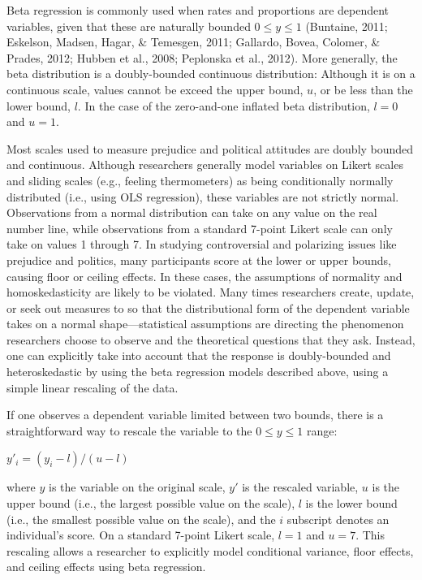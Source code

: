 \documentclass[english,,man]{apa6}
\begin{document}
Beta regression is commonly used when rates and proportions are dependent variables, given that these are naturally bounded \(0 \leq y \leq 1\) (Buntaine, 2011; Eskelson, Madsen, Hagar, \& Temesgen, 2011; Gallardo, Bovea, Colomer, \& Prades, 2012; Hubben et al., 2008; Peplonska et al., 2012). More generally, the beta distribution is a doubly-bounded continuous distribution: Although it is on a continuous scale, values cannot be exceed the upper bound, \(u\), or be less than the lower bound, \(l\). In the case of the zero-and-one inflated beta distribution, \(l = 0\) and \(u = 1\).

Most scales used to measure prejudice and political attitudes are doubly bounded and continuous. Although researchers generally model variables on Likert scales and sliding scales (e.g., feeling thermometers) as being conditionally normally distributed (i.e., using OLS regression), these variables are not strictly normal. Observations from a normal distribution can take on any value on the real number line, while observations from a standard 7-point Likert scale can only take on values 1 through 7. In studying controversial and polarizing issues like prejudice and politics, many participants score at the lower or upper bounds, causing floor or ceiling effects. In these cases, the assumptions of normality and homoskedasticity are likely to be violated. Many times researchers create, update, or seek out measures to so that the distributional form of the dependent variable takes on a normal shape---statistical assumptions are directing the phenomenon researchers choose to observe and the theoretical questions that they ask. Instead, one can explicitly take into account that the response is doubly-bounded and heteroskedastic by using the beta regression models described above, using a simple linear rescaling of the data.

If one observes a dependent variable limited between two bounds, there is a straightforward way to rescale the variable to the \(0 \leq y \leq 1\) range:

\begin{center}
$y'_i = (y_i - l) / (u - l)$
\end{center}

where \(y\) is the variable on the original scale, \(y'\) is the rescaled variable, \(u\) is the upper bound (i.e., the largest possible value on the scale), \(l\) is the lower bound (i.e., the smallest possible value on the scale), and the \(i\) subscript denotes an individual's score. On a standard 7-point Likert scale, \(l = 1\) and \(u = 7\). This rescaling allows a researcher to explicitly model conditional variance, floor effects, and ceiling effects using beta regression.
\end{document}
